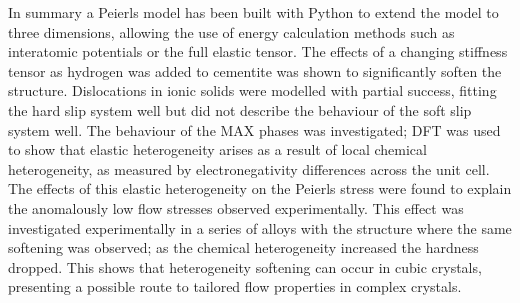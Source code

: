 In summary a Peierls model has been built with Python to extend the model to three dimensions, allowing the use of energy calculation methods such as interatomic potentials or the full elastic tensor. The effects of a changing stiffness tensor as hydrogen was added to cementite was shown to significantly soften the structure. Dislocations in ionic solids were modelled with partial success, fitting the hard slip system well but did not describe the behaviour of the soft slip system well. The behaviour of the MAX phases was investigated; DFT was used to show that elastic heterogeneity arises as a result of local chemical heterogeneity, as measured by electronegativity differences across the unit cell. The effects of this elastic heterogeneity on the Peierls stress were found to explain the anomalously low flow stresses observed experimentally. This effect was investigated experimentally in a series of alloys with the  structure where the same softening was observed; as the chemical heterogeneity increased the hardness dropped. This shows that heterogeneity softening can occur in cubic crystals, presenting a possible route to tailored flow properties in complex crystals.


































































